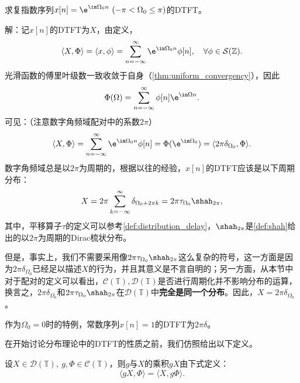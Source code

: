 \begin{example}[复指数序列的离散时间傅里叶变换]\label{exmp:exp_DTFT}
    求复指数序列$x[n]=\e^{\im\Omega_0 n}\ (-\pi<\Omega_0\leq\pi)$的DTFT。

    解：记$x[n]$的DTFT为$X$，由定义，
    \begin{equation}
        \langle X,\Phi\rangle=\langle x,\phi\rangle=\sum_{n=-\infty}^{\infty}\e^{\im\Omega_0 n}\phi[n],\quad \forall \phi\in\mathcal{S}(\mathbb{Z}).
    \end{equation}
    光滑函数的傅里叶级数一致收敛于自身（\cref{thm:uniform_convergency}），因此
    \begin{equation}
        \Phi(\Omega)=\sum_{n=-\infty}^{\infty}\phi[n]\e^{\im\Omega n}.
    \end{equation}
    可见：（注意数字角频域配对中的系数$2\pi$）
    \begin{equation}
        \langle X,\Phi\rangle=\sum_{n=-\infty}^{\infty}\e^{\im\Omega_0 n}\phi[n]=\Phi(\e^{\im\Omega_0})=\langle 2\pi\delta_{\Omega_0},\Phi\rangle.
    \end{equation}
    数字角频域总是以$2\pi$为周期的，根据以往的经验，$x[n]$的DTFT应该是以下周期分布：
    \begin{equation}
        X=2\pi\sum_{k=-\infty}^{\infty}\delta_{\Omega_0+2\pi k}=2\pi\tau_{\Omega_0}\shah_{2\pi},
    \end{equation}
    其中，平移算子$\tau$的定义可以参考\cref{def:distribution_delay}，$\shah_{2\pi}$是\cref{def:shah}给出的以$2\pi$为周期的Dirac梳状分布。

    但是，事实上，我们不需要采用像$2\pi\tau_{\Omega_0}\shah_{2\pi}$这么复杂的符号，这一方面是因为$2\pi\delta_{\Omega_0}$已经足以描述$X$的行为，并且其意义是不言自明的；另一方面，从本节中对于配对的定义可以看出，$\mathcal{C}(\mathbb{T}),\mathcal{D}(\mathbb{T})$是否进行周期化并不影响分布的运算，换言之，$2\pi\delta_{\Omega_0}$和$2\pi\tau_{\Omega_0}\shah_{2\pi}$在$\mathcal{D}(\mathbb{T})$中\textbf{完全是同一个分布}。因此，$X=2\pi\delta_{\Omega_0}$。
\end{example}

作为$\Omega_0=0$时的特例，常数序列$x[n]=1$的DTFT为$2\pi\delta$。

在开始讨论分布理论中的DTFT的性质之前，我们仿照给出以下定义。

\begin{definition}[分布与函数的乘法]
    设$X\in\mathcal{D}(\mathbb{T}),\ g,\Phi\in\mathcal{C}(\mathbb{T})$，则$g$与$X$的乘积$gX$由下式定义：
    \begin{equation}
        \langle gX,\Phi\rangle=\langle X,g\Phi\rangle.
    \end{equation}
\end{definition}

